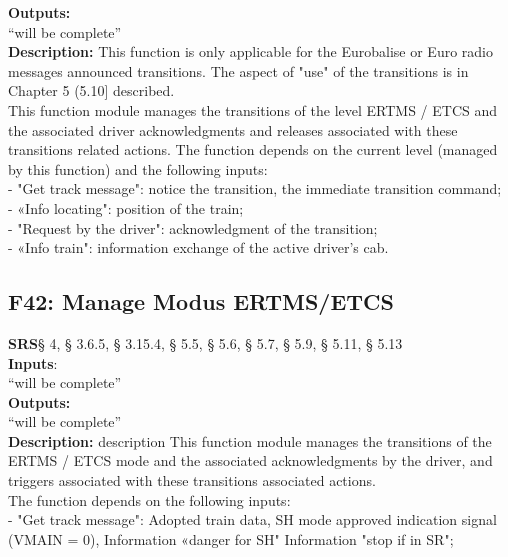\documentclass{template/openetcs_report}
\begin{document}
 \textbf{Outputs:}\\
 ``will be complete''\\
 
 \textbf{Description:} 
This function is only applicable for the Eurobalise or Euro radio messages 
announced transitions. The aspect of "use" of the transitions is in Chapter 5 (5.10]
described. \\

This function module manages the transitions of the level ERTMS / ETCS and the 
associated driver acknowledgments and releases associated with these transitions 
related actions. 
The function depends on the current level (managed by this function) and the 
following inputs: \\

- "Get track message": notice the transition, the immediate transition command; \\

- «Info locating": position of the train; \\

- "Request by the driver": acknowledgment of the transition; \\

- «Info train": information exchange of the active driver's cab.\\


 \subsection {F42: Manage Modus ERTMS/ETCS}
 \textbf{SRS}§ 4, § 3.6.5, § 3.15.4, § 5.5, § 5.6, § 5.7, § 5.9, § 5.11, § 5.13 \\
 
 \textbf{Inputs}:\\
``will be complete''\\
 
 \textbf{Outputs:}\\
 ``will be complete''\\
 
 \textbf{Description:} 
description 
This function module manages the transitions of the ERTMS / ETCS mode and the 
associated acknowledgments by the driver, and triggers associated with these transitions 
associated actions. \\

The function depends on the following inputs: \\

 - "Get track message": Adopted train data, SH mode approved indication signal 
(VMAIN = 0), Information «danger for SH" Information "stop if in SR"; \\
\end{document}
